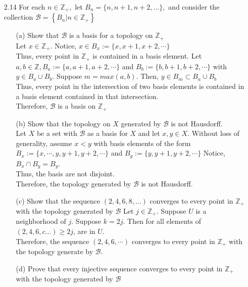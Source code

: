 \documentclass[12pt]{article}
\newcommand{\Z}{\mathds{Z}}
\newcommand{\B}{\mathcal{B}}
\begin{document}
\pagestyle{fancy}  
\lfoot{} \cfoot{} \rfoot{}

\begin{enumerate}
	\item[2.14] For each $n \in \mathbb { Z } _ { + } ,$ let $B _ { n } = \{ n , n + 1 , n + 2 , \ldots \} ,$ and consider the collection $\mathcal { B } = \left\{ B _ { n } | n \in \mathbb { Z } _ { + } \right\}$
	\begin{enumerate}
		\item[(a)] Show that $\mathcal { B }$ is a basis for a topology on $\mathbb { Z } _ { + }$\\
			Let $ x\in \Z_+ $. Notice, $ x \in B_x := \{x,x+1,x+2,\cdots\} $\\
			Thus, every point in $ \Z_+ $ is contained in a basis element.
			Let $ a,b\in\Z , B_a := \{a,a+1,a+2,\cdots\} $ and $ B_b := \{b,b+1,b+2,\cdots\} $ with $ y\in B_a \cup B_b $. Suppose $ m=max(a,b) $. Then, $ y\in B_m\subset B_a \cup B_b$\\
			Thus, every point in the intersection of two basis elements is contained in a basis element contained in that intersection.\\
			Therefore, $ \B $ is a basis on $ \Z_+ $
		\item[(b)] Show that the topology on $X$ generated by $\mathcal { B }$ is not Hausdorff.\\
		Let $ X $ be a set with $ \B $ as a basis for $ X $ and let $ x,y\in X $. Without loss of generality, assume $ x<y $ with basis elements of the form $ B_x := \{x,\cdots,y,y+1,y+2,\cdots\} $ and $ B_y := \{y,y+1,y+2,\cdots\} $ Notice, $ B_x \cap B_y = B_y$.\\
		Thus, the basis are not disjoint.\\
		Therefore, the topology generated by $ \B $ is not Hausdorff.
		\item[(c)] Show that the sequence $( 2,4,6,8 , \dots )$ converges to every point in $\mathbb { Z } _ { + }$ with the topology generated by $\mathcal { B }$
		Let $ j\in \Z_+ $. Suppose $ U $ is a neighborhood of $ j $. Suppose $ k = 2j $. Then for all elements of $ (2,4,6,c\dots) \geq 2j $, are in $ U $. \\ Therefore, the sequence $ (2,4,6,\cdots) $ converges to every point in $ \Z_+ $ with the topology generate by $ \B $.
		\item[(d)] Prove that every injective sequence converges to every point in $\mathbb { Z } _ { + }$ with the topology generated by $\mathcal { B }$\\

\end{enumerate}
\end{enumerate}
\end{document}
